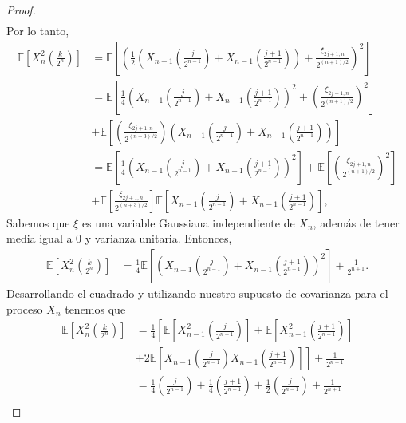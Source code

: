 \begin{proof}
\begin{align*}
	\end{align*}
Por lo tanto, 
	\begin{align*}
		\mathbb{E} \left[ X_n^2 \left( \frac{k}{2^n} \right) \right] & = \mathbb{E} \left[ \left( \frac{1}{2} \left( X_{n-1} \left( \frac{j}{2^{n-1}} \right) + X_{n-1} \left( \frac{j + 1}{2^{n-1}} \right) \right) + \frac{\xi_{2j+1, n}}{2^{(n+1)/2}} \right)^2 \right] \\
		& = \mathbb{E} \left[ \frac{1}{4} \left( X_{n-1} \left( \frac{j}{2^{n-1}} \right) + X_{n-1} \left( \frac{j + 1}{2^{n-1}} \right) \right)^2 + \left( \frac{\xi_{2j+1, n}}{2^{(n+1)/2}} \right)^2 \right] \\
		& + \mathbb{E} \left[ \left(\frac{\xi_{2j+1, n}}{2^{(n+3)/2}}\right) \left( X_{n-1} \left( \frac{j}{2^{n-1}} \right) + X_{n-1} \left( \frac{j + 1}{2^{n-1}} \right) \right) \right] \\	
		& = \mathbb{E} \left[ \frac{1}{4} \left( X_{n-1} \left( \frac{j}{2^{n-1}} \right) + X_{n-1} \left( \frac{j + 1}{2^{n-1}} \right) \right)^2 \right] + \mathbb{E} \left[ \left( \frac{\xi_{2j+1, n}}{2^{(n+1)/2}} \right)^2 \right] \\
		& + \mathbb{E} \left[\frac{\xi_{2j+1, n}}{2^{(n+3)/2}} \right] \mathbb{E} \left[ X_{n-1} \left( \frac{j}{2^{n-1}} \right) + X_{n-1} \left( \frac{j + 1}{2^{n-1}} \right) \right],
	\end{align*}
Sabemos que $\xi$ es una variable Gaussiana independiente de $X_n$, además de tener media igual a $0$ y varianza unitaria. Entonces,
	\begin{align*}
		\mathbb{E} \left[ X_n^2 \left( \frac{k}{2^n} \right) \right] & = \frac{1}{4} \mathbb{E} \left[ \left( X_{n-1} \left( \frac{j}{2^{n-1}} \right) + X_{n-1} \left( \frac{j + 1}{2^{n-1}} \right) \right)^2 \right] + \frac{1}{2^{n+1}}.
	\end{align*} 
Desarrollando el cuadrado y utilizando nuestro supuesto de covarianza para el proceso $X_n$ tenemos que
	\begin{align*}
	\mathbb{E} \left[ X_n^2 \left( \frac{k}{2^n} \right) \right] & = \frac{1}{4} \left[ \mathbb{E} \left[ X_{n-1}^2 \left( \frac{j}{2^{n-1}}  \right) \right] +  \mathbb{E} \left[ X_{n-1}^2 \left( \frac{j+1}{2^{n-1}} \right) \right] \right. \\
	& \left. + 2\mathbb{E} \left[ X_{n-1}\left( \frac{j}{2^{n-1}}  \right) X_{n-1} \left( \frac{j+1}{2^{n-1}} \right) \right] \right] + \frac{1}{2^{n+1}} \\
	& = \frac{1}{4} \left( \frac{j}{2^{n-1}} \right) + \frac{1}{4} \left( \frac{j+1}{2^{n-1}} \right) + \frac{1}{2} \left( \frac{j}{2^{n-1}} \right) + \frac{1}{2^{n+1}} \\

\end{align*}
\end{proof}

